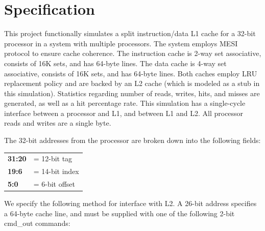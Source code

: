 \documentclass{article}
\begin{document}
\newpage

\section{Specification}


This project functionally simulates a split instruction/data L1 cache
for a 32-bit processor in a system with multiple processors.  The
system employs MESI protocol to ensure cache coherence.  The
instruction cache is 2-way set associative, consists of 16K sets, and
has 64-byte lines. The data cache is 4-way set associative, consists
of 16K sets, and has 64-byte lines.  Both caches employ LRU
replacement policy and are backed by an L2 cache (which is modeled as
a stub in this simulation).  Statistics regarding number of reads,
writes, hits, and misses are generated, as well as a hit percentage
rate.  This simulation has a single-cycle interface between a
processor and L1, and between L1 and L2.  All processor reads and
writes are a single byte.

The 32-bit addresses from the processor are broken down into the
following fields:

\begin{center}
  \begin{tabular}{ll}
    \textbf{31:20} & = 12-bit tag \\
    \textbf{19:6} & = 14-bit index \\
    \textbf{5:0} & = 6-bit offset
  \end{tabular}
\end{center}

We specify the following method for interface with L2.  A 26-bit
address specifies a 64-byte cache line, and must be supplied with one
of the following 2-bit cmd\_out commands:
\end{document}
